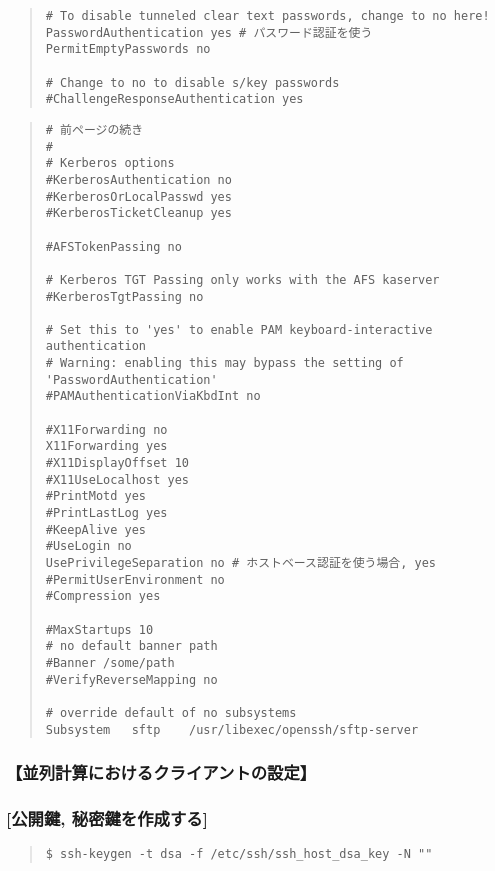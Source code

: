 \documentclass[a4paper,titlepage]{jreport}
\begin{document}
\begin{enumerate}
\begin{quote}
\begin{screen}
\begin{verbatim}
# To disable tunneled clear text passwords, change to no here!
PasswordAuthentication yes # パスワード認証を使う
PermitEmptyPasswords no 

# Change to no to disable s/key passwords
#ChallengeResponseAuthentication yes
\end{verbatim}
\end{screen}
\end{quote}

\begin{quote}
\begin{screen}
\begin{verbatim}
# 前ページの続き
#
# Kerberos options
#KerberosAuthentication no
#KerberosOrLocalPasswd yes
#KerberosTicketCleanup yes

#AFSTokenPassing no

# Kerberos TGT Passing only works with the AFS kaserver
#KerberosTgtPassing no

# Set this to 'yes' to enable PAM keyboard-interactive authentication 
# Warning: enabling this may bypass the setting of 'PasswordAuthentication'
#PAMAuthenticationViaKbdInt no

#X11Forwarding no
X11Forwarding yes
#X11DisplayOffset 10
#X11UseLocalhost yes
#PrintMotd yes
#PrintLastLog yes
#KeepAlive yes
#UseLogin no
UsePrivilegeSeparation no # ホストベース認証を使う場合, yes
#PermitUserEnvironment no
#Compression yes

#MaxStartups 10
# no default banner path
#Banner /some/path
#VerifyReverseMapping no

# override default of no subsystems
Subsystem	sftp	/usr/libexec/openssh/sftp-server
\end{verbatim}
\end{screen}
\end{quote}

\end{enumerate}

\subsubsection{【並列計算におけるクライアントの設定】}

\subsubsection{[公開鍵, 秘密鍵を作成する]}

\begin{quote}
\begin{screen}
\begin{verbatim}
$ ssh-keygen -t dsa -f /etc/ssh/ssh_host_dsa_key -N ""
\end{verbatim}
\end{screen}
\end{quote}
\end{document}

